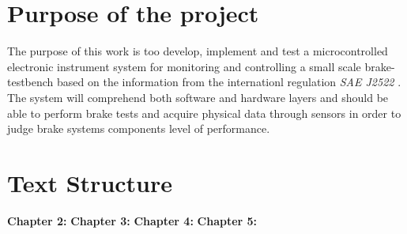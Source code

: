\section{Purpose of the project}
The purpose of this work is too develop, implement and test a microcontrolled electronic instrument system for monitoring and controlling a small scale brake-testbench based on the information from the internationl regulation \textit{SAE J2522} \cite{sae}. The system will comprehend both software and hardware layers and should be able to perform brake tests and acquire physical data through sensors in order to judge brake systems components level of performance.


\section{Text Structure} 
\textbf{Chapter 2:}
\textbf{Chapter 3:}
\textbf{Chapter 4:}
\textbf{Chapter 5:}
